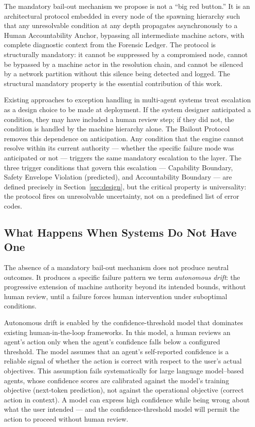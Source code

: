 The mandatory bail-out mechanism we propose is not a ``big red button.'' It is an architectural protocol embedded in every node of the spawning hierarchy such that any unresolvable condition at any depth propagates asynchronously to a Human Accountability Anchor, bypassing all intermediate machine actors, with complete diagnostic context from the Forensic Ledger. The protocol is structurally mandatory: it cannot be suppressed by a compromised node, cannot be bypassed by a machine actor in the resolution chain, and cannot be silenced by a network partition without this silence being detected and logged. The structural mandatory property is the essential contribution of this work.

Existing approaches to exception handling in multi-agent systems treat escalation as a design choice to be made at deployment. If the system designer anticipated a condition, they may have included a human review step; if they did not, the condition is handled by the machine hierarchy alone. The Bailout Protocol removes this dependence on anticipation. Any condition that the \bounds engine cannot resolve within its current authority — whether the specific failure mode was anticipated or not — triggers the same mandatory escalation to the \purpose layer. The three trigger conditions that govern this escalation — Capability Boundary, Safety Envelope Violation (predicted), and Accountability Boundary — are defined precisely in Section~\ref{sec:design}, but the critical property is universality: the protocol fires on unresolvable uncertainty, not on a predefined list of error codes.

\subsection{What Happens When Systems Do Not Have One}

The absence of a mandatory bail-out mechanism does not produce neutral outcomes. It produces a specific failure pattern we term \textit{autonomous drift}: the progressive extension of machine authority beyond its intended bounds, without human review, until a failure forces human intervention under suboptimal conditions.

Autonomous drift is enabled by the confidence-threshold model that dominates existing human-in-the-loop frameworks. In this model, a human reviews an agent's action only when the agent's confidence falls below a configured threshold. The model assumes that an agent's self-reported confidence is a reliable signal of whether the action is correct with respect to the user's actual objectives. This assumption fails systematically for large language model--based agents, whose confidence scores are calibrated against the model's training objective (next-token prediction), not against the operational objective (correct action in context). A model can express high confidence while being wrong about what the user intended — and the confidence-threshold model will permit the action to proceed without human review.

